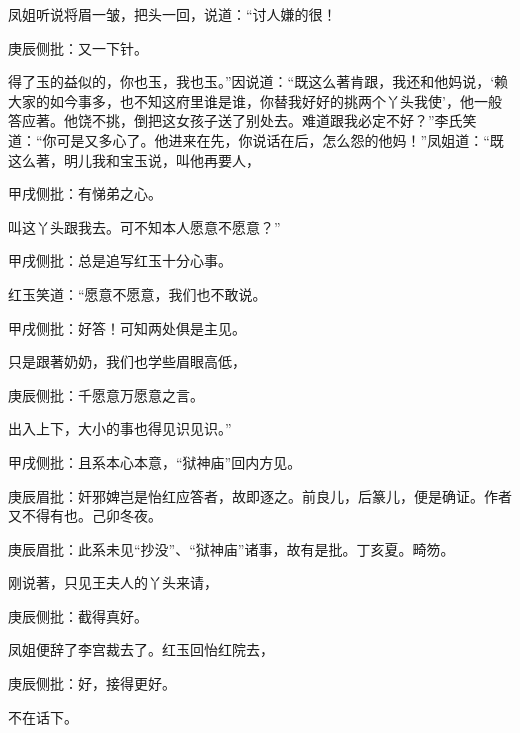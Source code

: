 \begin{parag}
    凤姐听说将眉一皱，把头一回，说道：“讨人嫌的很！\begin{note}庚辰侧批：又一下针。\end{note}得了玉的益似的，你也玉，我也玉。”因说道：“既这么著肯跟，我还和他妈说，‘赖大家的如今事多，也不知这府里谁是谁，你替我好好的挑两个丫头我使’，他一般答应著。他饶不挑，倒把这女孩子送了别处去。难道跟我必定不好？”李氏笑道：“你可是又多心了。他进来在先，你说话在后，怎么怨的他妈！”凤姐道：“既这么著，明儿我和宝玉说，叫他再要人，\begin{note}甲戌侧批：有悌弟之心。\end{note}叫这丫头跟我去。可不知本人愿意不愿意？”\begin{note}甲戌侧批：总是追写红玉十分心事。\end{note}红玉笑道：“愿意不愿意，我们也不敢说。\begin{note}甲戌侧批：好答！可知两处俱是主见。\end{note}只是跟著奶奶，我们也学些眉眼高低，\begin{note}庚辰侧批：千愿意万愿意之言。\end{note}出入上下，大小的事也得见识见识。”\begin{note}甲戌侧批：且系本心本意，“狱神庙”回内方见。\end{note}\begin{note}庚辰眉批：奸邪婢岂是怡红应答者，故即逐之。前良儿，后篆儿，便是确证。作者又不得有也。己卯冬夜。\end{note}\begin{note}庚辰眉批：此系未见“抄没”、“狱神庙”诸事，故有是批。丁亥夏。畸笏。\end{note}刚说著，只见王夫人的丫头来请，\begin{note}庚辰侧批：截得真好。\end{note}凤姐便辞了李宫裁去了。红玉回怡红院去，\begin{note}庚辰侧批：好，接得更好。\end{note}不在话下。
\end{parag}


